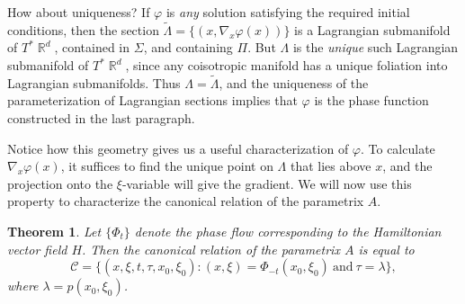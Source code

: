 \documentclass{article}
\theoremstyle{plain}
\newtheorem{theorem}{Theorem}
\theoremstyle{remark}
\theoremstyle{definition}
\DeclareMathOperator{\RR}{\mathbb{R}}
\begin{document}
How about uniqueness? If $\varphi$ is \emph{any} solution satisfying the required initial conditions, then the section $\tilde{\Lambda} = \{ (x, \nabla_x \varphi(x)) \}$ is a Lagrangian submanifold of $T^* \RR^d$, contained in $\Sigma$, and containing $\Pi$. But $\Lambda$ is the \emph{unique} such Lagrangian submanifold of $T^* \RR^d$, since any coisotropic manifold has a unique foliation into Lagrangian submanifolds. Thus $\Lambda = \tilde{\Lambda}$, and the uniqueness of the parameterization of Lagrangian sections implies that $\varphi$ is the phase function constructed in the last paragraph.

Notice how this geometry gives us a useful characterization of $\varphi$. To calculate $\nabla_x \varphi(x)$, it suffices to find the unique point on $\Lambda$ that lies above $x$, and the projection onto the $\xi$-variable will give the gradient. We will now use this property to characterize the canonical relation of the parametrix $A$.

\begin{theorem}
	Let $\{ \Phi_t \}$ denote the phase flow corresponding to the Hamiltonian vector field $H$. Then the canonical relation of the parametrix $A$ is equal to
	\[ \mathcal{C} = \Big\{ (x,\xi,t,\tau,x_0,\xi_0) : (x,\xi) = \Phi_{-t}(x_0,\xi_0)\ \text{and}\ \tau = \lambda \Big\}, \]
	where $\lambda = p(x_0,\xi_0)$.
\end{theorem}
\end{document}
